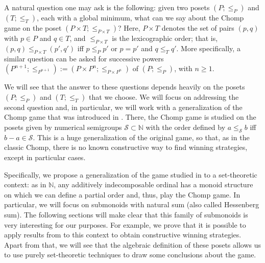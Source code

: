 \documentclass[reqno]{amsart}
\theoremstyle{definition}
\theoremstyle{definition}
\theoremstyle{plain} %
\begin{document}
A natural question one may ask is the following: given two posets $(P;\leq_P) $ and $(T;\leq_T)$, each with a global minimum, what can we say about the Chomp game on the poset $(P\times T;\leq_{P\times T})$? Here, $P\times T$ denotes the set of pairs $(p,q)$ with $p\in P$ and $q\in T$, and $\leq_{P\times T}$ is the lexicographic order; that is, $(p,q)\leq_{P\times T}(p',q')$ iff $p\leq_P p'$ or $p=p'$ and $q\leq_T q'$. More specifically, a similar question can be asked for successive powers $(P^{n+1};\leq_{P^{n+1}}):=(P\times P^{n};\leq_{P\times P^{n}})$ of $(P;\leq_P)$, with $n\geq 1$.

We will see that the answer to these questions depends heavily on the posets $(P;\leq_P)$ and $(T;\leq_T)$ that we choose. We will focus on addressing the second question and, in particular, we will work with a generalization of the Chomp game that was introduced in \cite{ALCO_2018__1_3_371_0}. There, the Chomp game is studied on the posets given by numerical semigroups $ \mathcal{S}\subset\mathbb{N}$ with the order defined by $a\leq_{\mathcal{S}}b$ iff $b-a\in\mathcal{S}$. This is a huge generalization of the original game, so that, as in the classic Chomp, there is no known constructive way to find winning strategies, except in particular cases.

Specifically, we propose a generalization of the game studied in \cite{ALCO_2018__1_3_371_0} to a set-theoretic context: as in $\mathbb{N}$, any additively indecomposable ordinal has a monoid structure on which we can define a partial order and, thus, play the Chomp game. In particular, we will focus on submonoids with natural sum (also called Hessenberg sum). The following sections will make clear that this family of submonoids is very interesting for our purposes. For example, we prove that it is possible to apply results from \cite{ALCO_2018__1_3_371_0} to this context to obtain constructive winning strategies. Apart from that, we will see that the algebraic definition of these posets allows us to use purely set-theoretic techniques to draw some conclusions about the game.
\end{document}
